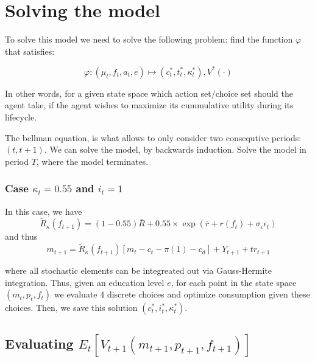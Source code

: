 \section{Solving the model}

To solve this model we need to solve the following problem: find the function $\varphi$ that satisfies:

\begin{equation}
    \varphi : (\mu_t, f_t, a_t , e) \mapsto (c_t^{*}, t^{*}_t, \kappa_t^{*}), V^{*}(\cdot)
\end{equation}

In other words, for a given state space which action set/choice set should the agent take, if the agent wishes to maximize its cummulative utility during its lifecycle.

The bellman equation, is what allows to only consider two consequtive periods: $(t, t+1)$. We can solve the model, by backwards induction. Solve the model in period $T$, where the model terminates.

\subsubsection{Case $\kappa_{t}=0.55$ and $i_{t}=1$}

In this case, we have
\[
\tilde{R}_{\kappa}(f_{t+1})=(1-0.55)\bar{R}+0.55\times\exp(\bar{r}+r(f_{t})+\sigma_{\epsilon}\epsilon_{t})
\]
and thus
\[
m_{t+1}=\tilde{R}_{\kappa}(f_{t+1})\left[m_{t}-c_{t}-\pi(1)-c_{d}\right]+Y_{t+1}+tr_{t+1}
\]

where all stochastic elements can be integreated out via Gauss-Hermite
integration. Thus, given an education level $e$, for each point in
the state space $(m_{t},p_{t},f_{t})$ we evaluate $4$ discrete choices
and optimize consumption given these choices. Then, we save this solution
$(c_{t}^{*},i_{t}^{*},\kappa_{t}^{*})$.

\subsection{Evaluating $E_{t}[V_{t+1}(m_{t+1},p_{t+1},f_{t+1})]$}

